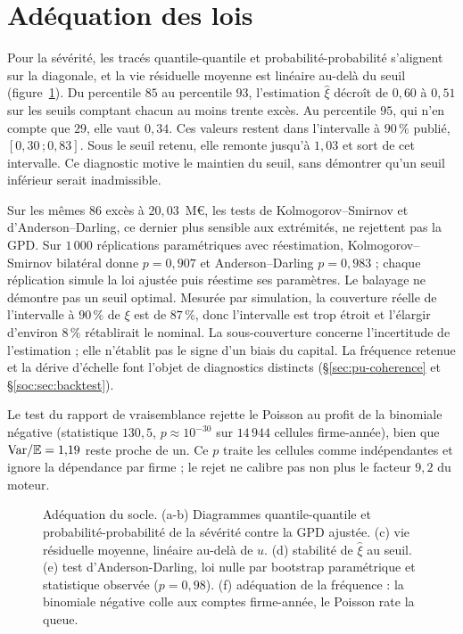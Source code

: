 \section{Adéquation des lois}
\label{soc:sec:validation}

Pour la sévérité, les tracés quantile-quantile et probabilité-probabilité s'alignent sur la
diagonale, et la vie résiduelle moyenne est linéaire au-delà du seuil (figure~\ref{soc:fig:validation}).
Du percentile $85$ au percentile $93$, l'estimation $\hat\xi$ décroît de $0{,}60$ à $0{,}51$ sur
les seuils comptant chacun au moins trente excès. Au percentile $95$, qui n'en compte que $29$, elle
vaut $0{,}34$. Ces valeurs restent dans l'intervalle à $90\,\%$ publié, $[0{,}30\,;0{,}83]$. Sous le
seuil retenu, elle remonte jusqu'à $1{,}03$ et sort de cet intervalle. Ce diagnostic motive le maintien du seuil, sans démontrer qu'un seuil inférieur serait inadmissible.

Sur les mêmes $86$ excès à $20{,}03$~M\euro, les tests de Kolmogorov--Smirnov et d'Anderson--Darling, ce dernier plus sensible aux extrémités, ne rejettent pas la GPD.
Sur $1\,000$ réplications paramétriques avec réestimation, Kolmogorov--Smirnov bilatéral donne
$p=0{,}907$ et Anderson--Darling $p=0{,}983$ ; chaque réplication simule la loi ajustée puis réestime ses paramètres. Le balayage ne démontre pas un seuil optimal. Mesurée par simulation, la couverture
réelle de l'intervalle à $90\,\%$ de $\xi$ est de $87\,\%$, donc l'intervalle est trop
étroit et l'élargir d'environ $8\,\%$ rétablirait le nominal. La sous-couverture concerne l'incertitude de l'estimation ; elle n'établit pas le signe d'un biais du capital. La fréquence retenue et la dérive d'échelle font l'objet de diagnostics distincts (\S\ref{sec:pu-coherence} et \S\ref{soc:sec:backtest}).

Le test du rapport de vraisemblance rejette le Poisson au profit de la binomiale négative (statistique $130{,}5$, $p\approx 10^{-30}$ sur $14\,944$ cellules firme-année), bien que $\mathrm{Var}/\mathbb{E}=1{,}19$ reste proche de un. Ce $p$ traite les cellules comme indépendantes et ignore la dépendance par firme ; le rejet ne calibre pas non plus le facteur $9{,}2$ du moteur.

\begin{figure}[H]\centering
{}
\caption{Adéquation du socle. (a-b) Diagrammes quantile-quantile et probabilité-probabilité de la sévérité
contre la GPD ajustée. (c) vie résiduelle moyenne, linéaire au-delà de $u$. (d) stabilité
de $\hat\xi$ au seuil. (e) test d'Anderson-Darling, loi nulle par bootstrap
paramétrique et statistique observée ($p=0{,}98$). (f) adéquation de la fréquence :
la binomiale négative colle aux comptes firme-année, le Poisson rate la queue.}
\label{soc:fig:validation}
\end{figure}

